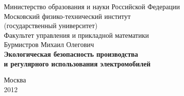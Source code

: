 {
	\renewcommand{\baselinestretch}{1}
	\thispagestyle{empty}
	\begin{center}
		\sc
			Министерство образования и науки Российской Федерации\\
			Московский физико-технический институт\\
			{\rm(государственный университет)}\\
			Факультет управления и прикладной математики\\
			[80mm]
		\rm\large
			Бурмистров Михаил Олегович\\[15mm] 
		\bf\Large
			Экологическая безопасность производства \\
			и регулярного использования электромобилей\\ [60mm]
		\sc
	\end{center}
	\vspace{3cm}
	\begin{center}
		Москва\\
		2012
	\end{center}
}